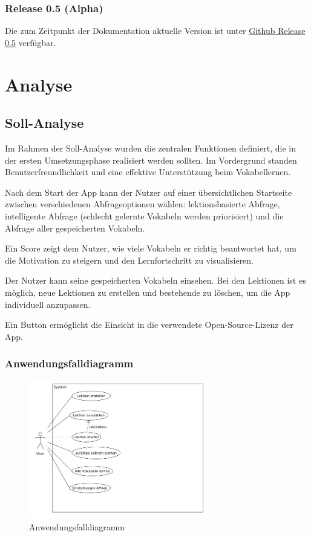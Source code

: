 \documentclass[12pt,a4paper]{article}
\begin{document}
\subsubsection{Release 0.5 (Alpha)}
Die zum Zeitpunkt der Dokumentation aktuelle Version ist unter \href{https://github.com/Erik-Donath/Palabra/releases/tag/0.5}{Github Release 0.5} verfügbar.

\section{Analyse}

\subsection{Soll-Analyse}
Im Rahmen der Soll-Analyse wurden die zentralen Funktionen definiert, die in der ersten Umsetzungsphase realisiert werden sollten. Im Vordergrund standen Benutzerfreundlichkeit und eine effektive Unterstützung beim Vokabellernen.

Nach dem Start der App kann der Nutzer auf einer übersichtlichen Startseite zwischen verschiedenen Abfrageoptionen wählen: lektionsbasierte Abfrage, intelligente Abfrage (schlecht gelernte Vokabeln werden priorisiert) und die Abfrage aller gespeicherten Vokabeln.

Ein Score zeigt dem Nutzer, wie viele Vokabeln er richtig beantwortet hat, um die Motivation zu steigern und den Lernfortschritt zu visualisieren.

Der Nutzer kann seine gespeicherten Vokabeln einsehen. Bei den Lektionen ist es möglich, neue Lektionen zu erstellen und bestehende zu löschen, um die App individuell anzupassen.

Ein Button ermöglicht die Einsicht in die verwendete Open-Source-Lizenz der App.

\subsubsection{Anwendungsfalldiagramm}
\begin{figure}[H]
    \centering
    \includegraphics[width=0.7\textwidth]{use-case-diagramm.jpeg}
    \caption{Anwendungsfalldiagramm}
    \label{fig:festes_bild}
\end{figure}
\end{document}
